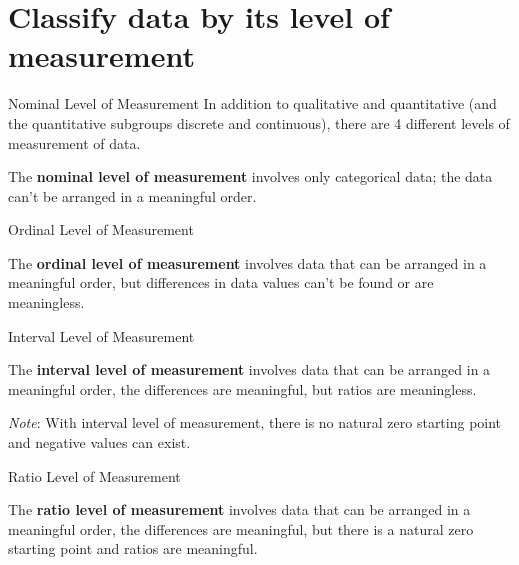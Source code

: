 \documentclass[t]{beamer}
\begin{document}
\section{Classify data by its level of measurement}

\begin{frame}{Nominal Level of Measurement}
In addition to qualitative and quantitative (and the quantitative subgroups discrete and continuous), there are 4 different levels of measurement of data.	\newline\\	\pause
\begin{tcolorbox}[colframe=green!20!black, colback = green!30!white,title=\textbf{Nominal Level of Data}]
The \textbf{nominal level of measurement} involves only categorical data; the data can't be arranged in a meaningful order.
\end{tcolorbox}
\end{frame}

\begin{frame}{Ordinal Level of Measurement}
\begin{tcolorbox}[colframe=green!20!black, colback = green!30!white,title=\textbf{Ordinal Level of Data}]
The \textbf{ordinal level of measurement} involves data that can be arranged in a meaningful order, but differences in data values can't be found or are meaningless.
\end{tcolorbox}
\end{frame}

\begin{frame}{Interval Level of Measurement}
\begin{tcolorbox}[colframe=green!20!black, colback = green!30!white,title=\textbf{Interval Level of Data}]
The \textbf{interval level of measurement} involves data that can be arranged in a meaningful order, the differences are meaningful, but ratios are meaningless.
\end{tcolorbox}
\vspace{10pt}	\pause
\emph{Note}: With interval level of measurement, there is no natural zero starting point and negative values can exist.
\end{frame}

\begin{frame}{Ratio Level of Measurement}
\begin{tcolorbox}[colframe=green!20!black, colback = green!30!white,title=\textbf{Ratio Level of Data}]
The \textbf{ratio level of measurement} involves data that can be arranged in a meaningful order, the differences are meaningful, but there is a natural zero starting point and ratios are meaningful.
\end{tcolorbox}
\end{frame}
\end{document}
